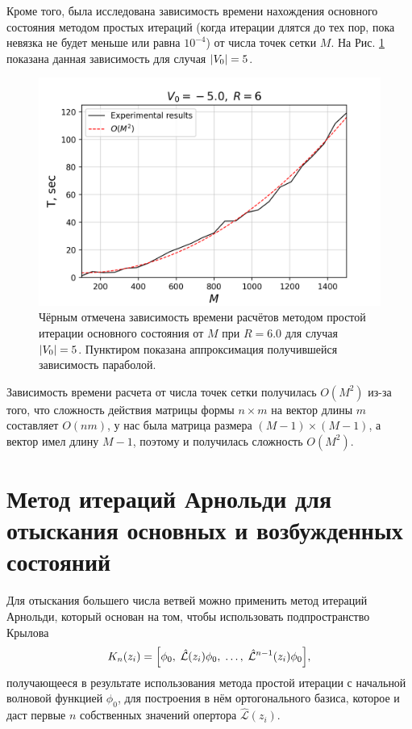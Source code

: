 \documentclass[10pt]{article}
\begin{document}
Кроме того, была исследована зависимость времени нахождения основного состояния методом простых итераций (когда итерации длятся до тех пор, пока невязка не будет меньше или равна  $10^{-4}$) от числа точек сетки $M$. На Рис. \ref{fig:T_vs_M_5_l0} показана данная зависимость для случая $\abs{V_0}=5$.
\begin{figure}
 \centering
 \includegraphics[width=\textwidth]{../figures/T_vs_M_5.0_l0}
 \caption{Чёрным отмечена зависимость времени расчётов методом простой итерации основного состояния от $M$ при $R=6.0$ для случая $\abs{V_0}=5$. Пунктиром показана аппроксимация получившейся зависимость параболой.}
 \label{fig:T_vs_M_5_l0}
\end{figure}
Зависимость времени расчета от числа точек сетки получилась $O(M^2)$ из-за того, что сложность действия матрицы формы $n\times m$ на вектор длины $m$ составляет  $O(nm)$, у нас была матрица размера $(M-1)\times (M-1)$, а вектор имел длину $M-1$, поэтому и получилась сложность $O(M^2)$.

\section{Метод итераций Арнольди для отыскания основных и возбужденных состояний}

Для отыскания большего числа ветвей можно применить метод итераций Арнольди, который основан на том, чтобы использовать подпространство Крылова
$$
K_n(z_i) = \qty[\phi_0,\; \hat{\mathcal{L}}(z_i)\phi_0,\; \ldots,\; \hat{\mathcal{L}}^{n-1}(z_i)\phi_0],
$$
получающееся в результате использования метода простой итерации с начальной волновой функцией $\phi_0$, для построения в нём ортогонального базиса, которое и даст первые $n$ собственных значений опертора $\hat{\mathcal{L}}(z_i)$.
\end{document}
